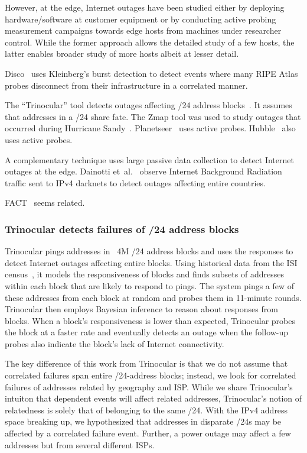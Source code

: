 However, at the edge, Internet outages have been studied either by deploying
hardware/software at customer equipment or by conducting active
probing measurement campaigns towards edge hosts from machines under
researcher control. While the former approach allows the detailed study of
a few hosts, the latter enables broader study of more hosts albeit at
lesser detail. 

Disco~\cite{disco} uses Kleinberg's burst detection to detect
events where many RIPE Atlas probes disconnect from
their infrastructure in a correlated manner.

The ``Trinocular'' tool detects outages affecting /24 address
blocks~\cite{trinocular}.  It assumes that addresses in a /24 share fate.
The Zmap tool was used to study outages that occurred during Hurricane Sandy~\cite{durumeric2013zmap}.
Planetseer~\cite{planetseer} uses active probes.
Hubble~\cite{hubble} also uses active probes.

A complementary technique uses large passive data collection to detect
Internet outages at the edge. Dainotti et~al.~\cite{dainotti-imc11} observe Internet Background
Radiation traffic sent to IPv4 darknets to detect outages affecting
entire countries. 

FACT~\cite{fact-flowbased-connectivity} seems related.




\subsubsection{Trinocular detects failures of /24 address blocks}

Trinocular pings addresses in ~4M /24 address blocks and
uses the responses to detect Internet outages affecting entire blocks. Using historical
data from the ISI census~\cite{}, it models the responsiveness of
blocks and finds subsets of addresses within each block that are
likely to respond to pings. The system pings a few of these addresses
from each block at random and probes them in 11-minute
rounds. Trinocular then employs Bayesian inference to reason about
responses from blocks. When a block's responsiveness is lower than
expected, Trinocular probes the block at a faster rate and eventually
detects an outage when the follow-up probes also indicate the block's
lack of Internet connectivity.

The key difference of this work from Trinocular is that we do not assume
that correlated failures span entire /24-address blocks; instead, we
look for correlated failures of addresses related by geography and
ISP. While we share Trinocular's intuiton that dependent events will
affect related addresses, Trinocular's notion of relatedness is solely
that of belonging to the same /24. With the IPv4 address space
breaking up, we hypothesized that addresses in disparate /24s may be
affected by a correlated failure event. Further, a power outage may
affect a few addresses but from several different ISPs.

